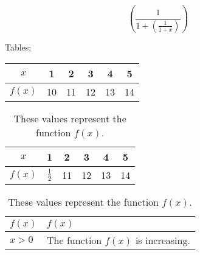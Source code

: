 \documentclass{article}
\begin{document}
$$\left(  \frac{1}{1 + \left( \frac{1}{1+x} \right)}  \right)$$

Tables:\\

\begin{tabular}{|c|c|c|c|c|c|}
  \hline
  $x$    & 1  & 2  & 3  & 4  & 5 \\ \hline
  $f(x)$ & 10 & 11 & 12 & 13 & 14 \\ \hline
\end{tabular}

\vspace{1cm}

\begin{table}[H]
  \centering
  \def\arraystretch{1.3}
  \begin{tabular}{|c|c|c|c|c|c|}
    \hline
    $x$    & 1  & 2  & 3  & 4  & 5 \\ \hline
    $f(x)$ & $\frac{1}{2}$ & 11 & 12 & 13 & 14 \\ \hline
  \end{tabular}
  \caption{These values represent the function $f(x)$.}
\end{table}

\begin{table}[H]
  \centering
  \def\arraystretch{1.3}
  \caption{These values represent the function $f(x)$.}
  \begin{tabular}{|l|p{2cm}|}
    \hline
    $f(x)$ & $f(x)$ \\ \hline
    $x>0$  & The function $f(x)$ is increasing. \\ \hline
  \end{tabular}
\end{table}
\end{document}
